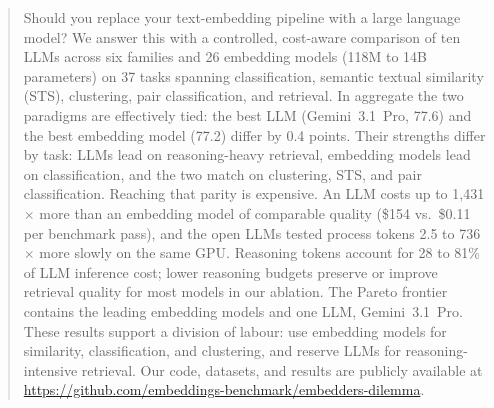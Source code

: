 \begin{abstract}
Should you replace your text-embedding pipeline with a large language model?
We answer this with a controlled, cost-aware comparison of ten LLMs across six families and 26 embedding models (118M to 14B parameters) on 37 tasks spanning classification, semantic textual similarity (STS), clustering, pair classification, and retrieval.
In aggregate the two paradigms are effectively tied: the best LLM (Gemini~3.1~Pro, 77.6) and the best embedding model (77.2) differ by 0.4 points.
Their strengths differ by task: LLMs lead on reasoning-heavy retrieval, embedding models lead on classification, and the two match on clustering, STS, and pair classification.
Reaching that parity is expensive. An LLM costs up to 1{,}431$\times$ more than an embedding model of comparable quality (\$154 vs.\ \$0.11 per benchmark pass), and the open LLMs tested process tokens 2.5 to 736$\times$ more slowly on the same GPU.
Reasoning tokens account for 28 to 81\% of LLM inference cost; lower reasoning budgets preserve or improve retrieval quality for most models in our ablation.
The Pareto frontier contains the leading embedding models and one LLM, Gemini~3.1~Pro.
These results support a division of labour: use embedding models for similarity, classification, and clustering, and reserve LLMs for reasoning-intensive retrieval.
Our code, datasets, and results are publicly available at \url{https://github.com/embeddings-benchmark/embedders-dilemma}.
\end{abstract}
